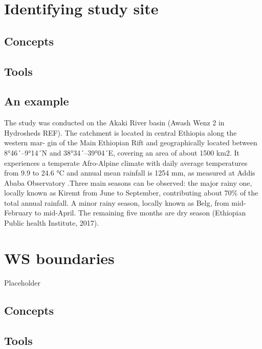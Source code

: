 \documentclass[
]{book}
\begin{document}
\hypertarget{intro}{%
\chapter{Identifying study site}\label{intro}}

\hypertarget{concepts}{%
\section{Concepts}\label{concepts}}

\hypertarget{tools}{%
\section{Tools}\label{tools}}

\hypertarget{an-example}{%
\section{An example}\label{an-example}}

The study was conducted on the Akaki River basin (Awash Wenz 2 in Hydrosheds REF). The catchment is located in central Ethiopia along the western mar- gin of the Main Ethiopian Rift and geographically located between 8°46´--9°14´N and 38°34´--39°04´E, covering an area of about 1500 km2. It experiences a temperate Afro-Alpine climate with daily average temperatures from 9.9 to 24.6 °C and annual mean rainfall is 1254 mm, as measured at Addis Ababa Observatory .Three main seasons can be observed: the major rainy one, locally known as Kiremt from June to September, contributing about 70\% of the total annual rainfall. A minor rainy season, locally known as Belg, from mid-February to mid-April. The remaining five months are dry season (Ethiopian Public health Institute, 2017).

\hypertarget{boundaries}{%
\chapter{WS boundaries}\label{boundaries}}

Placeholder

\hypertarget{concepts-1}{%
\section{Concepts}\label{concepts-1}}

\hypertarget{tools-1}{%
\section{Tools}\label{tools-1}}
\end{document}
